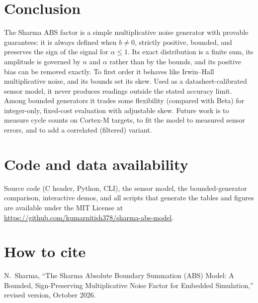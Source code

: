 \documentclass[10pt,a4paper]{article}
\theoremstyle{definition}
\theoremstyle{remark}
\begin{document}
\section{Conclusion}
The Sharma ABS factor is a simple multiplicative noise generator with provable guarantees: it
is always defined when $b\ne0$, strictly positive, bounded, and preserves the sign of the
signal for $\alpha\le1$. Its exact distribution is a finite sum, its amplitude is governed by
$n$ and $\alpha$ rather than by the bounds, and its positive bias can be removed exactly. To
first order it behaves like Irwin--Hall multiplicative noise, and its bounds set its skew.
Used as a datasheet-calibrated sensor model, it never produces readings outside the stated
accuracy limit. Among bounded generators it trades some flexibility (compared with Beta) for
integer-only, fixed-cost evaluation with adjustable skew. Future work is to measure cycle
counts on Cortex-M targets, to fit the model to measured sensor errors, and to add a
correlated (filtered) variant.

\section*{Code and data availability}
Source code (C header, Python, CLI), the sensor model, the bounded-generator comparison,
interactive demos, and all scripts that generate the tables and figures are available under
the MIT License at
\url{https://github.com/kumarnitish378/sharma-abs-model}.

\section*{How to cite}
N.~Sharma, ``The Sharma Absolute Boundary Summation (ABS) Model: A Bounded,
Sign-Preserving Multiplicative Noise Factor for Embedded Simulation,'' revised version,
October 2026.
\end{document}
